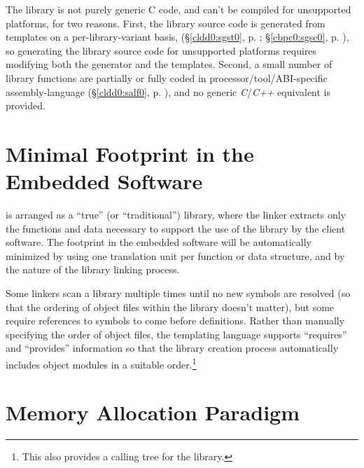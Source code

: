 The library is not purely generic C code, and can't be 
compiled for unsupported platforms, for two reasons.  First, 
the library source code is generated from templates on a 
per-library-variant basis, (\S{}\ref{cldd0:sgst0}, p.  
\pageref{cldd0:sgst0}; \S{}\ref{cbpc0:sgsc0}, p.  
\pageref{cbpc0:sgsc0}), so generating the library source 
code for unsupported platforms requires modifying both the 
generator and the templates.  Second, a small number of 
library functions are partially or fully coded in 
processor/\-tool/\-ABI-specific assembly-language 
(\S{}\ref{cldd0:salf0}, p.  \pageref{cldd0:salf0}), and no 
generic \emph{C}/\emph{C++} equivalent is provided.


\section{Minimal Footprint in the Embedded Software}
\label{cldd0:smfe0}

\emph{\productbasenameshort{}} is arranged as a ``true'' (or 
``traditional'') library, where the linker extracts only the 
functions and data necessary to support the use of the 
library by the client software.  The 
\emph{\productbasenameshort{}} footprint in the embedded 
software will be automatically minimized by using one 
translation unit per function or data structure, and by the 
nature of the library linking process.  

Some linkers scan a library multiple times until no new 
symbols are resolved (so that the ordering of object files 
within the library doesn't matter), but some require 
references to symbols to come before definitions.  Rather 
than manually specifying the order of object files, the 
templating language supports ``requires'' and ``provides'' 
information so that the library creation process 
automatically includes object modules in a suitable 
order.\footnote{This also provides a calling tree for the 
library.} 


\section{Memory Allocation Paradigm}
\label{cldd0:smap0}

